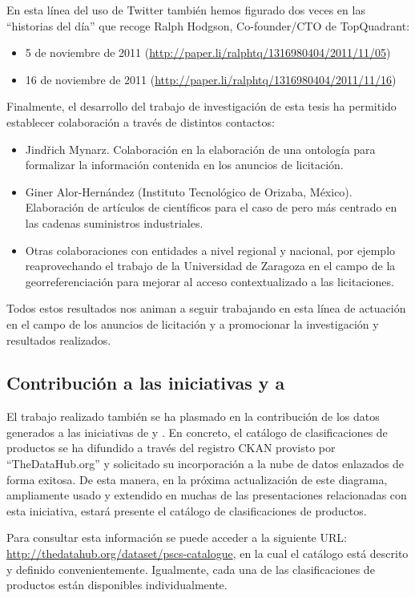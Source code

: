 En esta línea del uso de Twitter también hemos figurado dos veces en las ``historias del día'' que recoge Ralph Hodgson, Co-founder/CTO de TopQuadrant:
\begin{itemize}
 \item 5 de noviembre de 2011 (\url{http://paper.li/ralphtq/1316980404/2011/11/05})
 \item 16 de noviembre de 2011 (\url{http://paper.li/ralphtq/1316980404/2011/11/16})
\end{itemize}

Finalmente, el desarrollo del trabajo de investigación de esta tesis ha permitido establecer colaboración a través
de distintos contactos:
\begin{itemize}
 \item Jindřich Mynarz. Colaboración en la elaboración de una ontología para formalizar la información
contenida en los anuncios de licitación.
\item Giner Alor-Hernández (Instituto Tecnológico de Orizaba, México). Elaboración de artículos de científicos para el 
caso de \eproc pero más centrado en las cadenas suministros industriales.
\item Otras colaboraciones con entidades a nivel regional y nacional, por ejemplo reaprovechando el trabajo de la Universidad de Zaragoza 
en el campo de la georreferenciación para mejorar al acceso contextualizado a las licitaciones.
\end{itemize}

Todos estos resultados nos animan a seguir trabajando en esta línea de actuación en el campo de los
anuncios de licitación y a promocionar la investigación y resultados realizados.


\subsection{Contribución a las iniciativas \linkeddata y a \lod}
El trabajo realizado también se ha plasmado en la contribución de los datos generados a las iniciativas 
de \linkeddata y \lod. En concreto, el catálogo de clasificaciones de productos se ha difundido 
a través del registro \gls{CKAN} provisto por ``TheDataHub.org'' y solicitado su incorporación 
a la nube de datos enlazados de forma exitosa. De esta manera, en la próxima 
actualización de este diagrama, ampliamente usado y extendido en muchas de las presentaciones 
relacionadas con esta iniciativa, estará presente el catálogo de clasificaciones de productos.

Para consultar esta información se puede acceder a la siguiente \gls{URL}: \url{http://thedatahub.org/dataset/pscs-catalogue}, 
en la cual el catálogo está descrito y definido convenientemente. Igualmente, cada una de las clasificaciones de productos 
están disponibles individualmente. 

